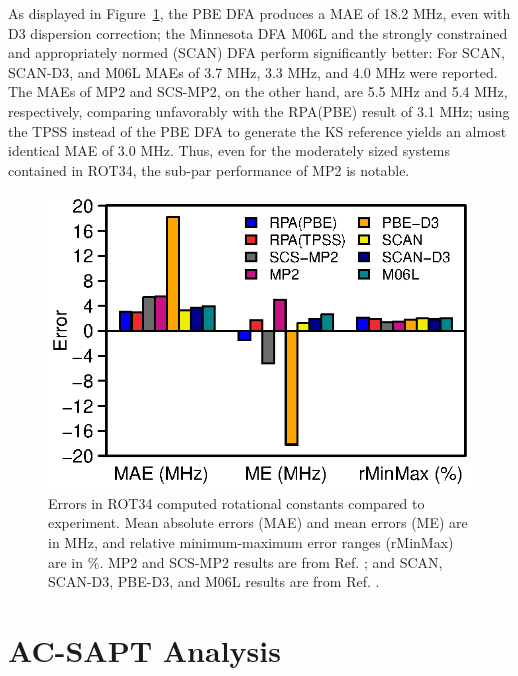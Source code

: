 \documentclass[journal=jctcce,manuscript=article]{achemso}
\begin{document}
As displayed in Figure~\ref{fig:methods_bar},
the PBE DFA produces a MAE of 18.2 MHz, even with D3 dispersion correction;
the Minnesota DFA M06L\cite{doi:10.1063/1.2370993}
and the strongly constrained and appropriately normed (SCAN)\cite{PhysRevLett.115.036402}
DFA perform significantly better:\cite{BrandenburgPhysRevB} For SCAN, SCAN-D3,
and M06L MAEs of 3.7 MHz, 3.3 MHz, and 4.0 MHz were
reported.\cite{BrandenburgPhysRevB} The MAEs of MP2 
and SCS-MP2, on the other hand, are 5.5 MHz and 5.4
MHz,\cite{Risthaus14JComputChem35p1509} respectively, comparing
unfavorably with the RPA(PBE) result of 3.1 MHz; using the TPSS instead
of the PBE DFA to generate the KS reference yields an almost identical
MAE of 3.0 MHz. Thus, even for the moderately sized systems contained in
ROT34, the sub-par performance of MP2 is notable.

\begin{figure}[hbtp]
   \centering
  \includegraphics{deviate_v4.eps}
  \caption{Errors in ROT34 computed rotational constants compared to
    experiment.\cite{Risthaus14JComputChem35p1509}  
    Mean absolute errors (MAE) and mean errors (ME) are in MHz,
    and relative minimum-maximum error ranges
    (rMinMax) are in $\%$. MP2 and SCS-MP2 results are from
    Ref. ; and SCAN, SCAN-D3,
    PBE-D3, and M06L results are from Ref. .}
  \label{fig:methods_bar}
\end{figure}

\section{AC-SAPT Analysis}
\label{sec:SAPT}
\end{document}
